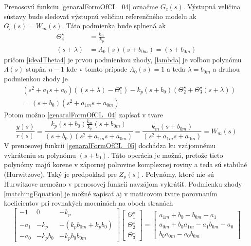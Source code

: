 \documentclass[a4paper, 10pt, ]{article}
\begin{document}
Prenosovú funkciu \eqref{genaralFormOfCL_04} označme $G_c(s)$. Výstupná veličina sústavy bude sledovať výstupnú veličinu referenčného modelu ak $G_c(s) = W_m(s)$. Táto podmienka bude splnená ak
\begin{align}
	\Theta_4^\star &= \frac{k_m}{k_p} \label{idealTheta4} \\
	(s + \lambda) &= \Lambda_0(s) (s + b_{0m}) = (s + b_{0m}) \label{lambda}
\end{align}
pričom \eqref{idealTheta4} je prvou podmienkou zhody, \eqref{lambda} je voľbou polynómu $\Lambda(s)$ stupňa $n-1$ kde v tomto prípade $\Lambda_0(s) = 1$ a teda $\lambda = b_{0m}$ a druhou podmienkou zhody je
\begin{equation} \label{matchingEquation}
    \begin{split}
    	&(s^2 + a_1 s + a_0)
    	\left( (s + \lambda) - \Theta_1^\star \right)
    	-
    	k_p
    	(s + b_0)
    	\left( \Theta_2^\star + \Theta_3^\star (s + \lambda) \right)
    	\\&=
    	(s + b_0)   ( s^2 + a_{1m} s + a_{0m})
    \end{split}
\end{equation}
Potom možno \eqref{genaralFormOfCL_04} zapísať v tvare
\begin{equation} \label{genaralFormOfCL_05}
	\frac{y(s)}{r(s)}
	=
	\frac{
		k_p
		(s + b_0)
		\frac{k_m}{k_p}
		(s + b_{0m})
		}{
		(s + b_0)
		( s^2 + a_{1m} s + a_{0m})}
	=
	\frac{
		k_m
		(s + b_{0m})
		}{
		( s^2 + a_{1m} s + a_{0m})}
	=
	W_m(s)
\end{equation}
V prenosovej funkcii \eqref{genaralFormOfCL_05} dochádza ku vzájomnému  vykráteniu sa polynómu $(s + b_0)$. Táto operácia je možná, pretože tieto polynómy majú korene v zápornej polrovine komplexnej roviny a teda sú stabilné (Hurwitzove). Taký je predpoklad pre $Z_p(s)$. Polynómy, ktoré nie sú Hurwitzove nemožno v prenosovej funkcii navzájom vykrátiť. Podmienku zhody \eqref{matchingEquation} je možné zapísať aj v maticovom tvare porovnaním koeficientov pri rovnakých mocninách na oboch stranách
\begin{equation} \label{idealParameters}
	\begin{bmatrix}
		-1 & 0 & -k_p \\
		-a_1 & -k_p & -(k_p b_{0m} + k_p b_0) \\
		-a_0 & -k_p b_0 & -k_p b_0 b_{0m}
	\end{bmatrix}
	\begin{bmatrix}
    	  \Theta_1^\star \\
		  \Theta_2^\star \\
		  \Theta_3^\star
 	\end{bmatrix}
	=
	\begin{bmatrix}
    	a_{1m} + b_0 - b_{0m} - a_1 \\
    	a_{0m} + b_0 a_{1m} - a_1 b_{0m} - a_0 \\
    	b_0 a_{0m} - a_0 b_{0m}
  	\end{bmatrix}
\end{equation}
\end{document}
